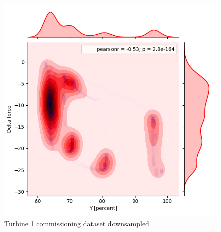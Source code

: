 \begin{figure}[ht]
\begin{minipage}[b]{0.5\linewidth}
        \includegraphics[width=1\linewidth]{figures/data/kdePlot_reduced_noServo_A1.png} 
        \caption{Turbine 1 commissioning dataset downsampled} 
    \end{minipage} 
\end{figure}
